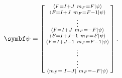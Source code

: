 \begin{align}
\vec \psi = \left[\begin{smallmatrix}
\braket{F=I+J\ m_F=F}{\psi}\\
\braket{F=I+J\ m_F=F-1}{\psi}\\
\vdots\\
\braket{F=I+J\ m_F=-F}{\psi}\\
\braket{F=I+J-1\ m_F=F}{\psi}\\
\braket{F=I+J-1\ m_F=F-1}{\psi}\\
\vdots\\
\vdots\\
\braket{m_F=\abs{I-J}\ m_F=-F}{\psi}\\
\end{smallmatrix}\right].
\end{align}

